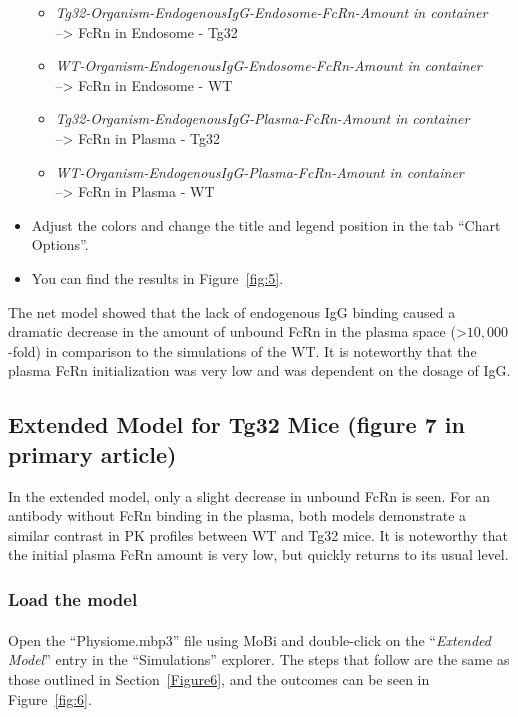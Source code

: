 \documentclass[fleqn,10pt]{physiome}
\begin{document}
\begin{itemize}
\begin{itemize}
        \item \textit{Tg32-Organism-EndogenousIgG-Endosome-FcRn-Amount in container} 
        \\--> FcRn in Endosome - Tg32
        \item \textit{WT-Organism-EndogenousIgG-Endosome-FcRn-Amount in container} 
        \\--> FcRn in Endosome - WT
        \item \textit{Tg32-Organism-EndogenousIgG-Plasma-FcRn-Amount in container} 
        \\--> FcRn in Plasma - Tg32
        \item \textit{WT-Organism-EndogenousIgG-Plasma-FcRn-Amount in container} 
        \\--> FcRn in Plasma - WT
    \end{itemize}
    \item Adjust the colors and change the title and legend position in the tab ``Chart Options''.
    \item You can find the results in Figure~\ref{fig:5}.
\end{itemize}

The net model showed that the lack of endogenous IgG binding caused a dramatic decrease in the amount of unbound FcRn in the plasma space (>$10,000$-fold) in comparison to the simulations of the WT. It is noteworthy that the plasma FcRn initialization was very low and was dependent on the dosage of IgG.



\subsection{Extended Model for Tg32 Mice (figure 7 in primary article)}\label{Figure7}

In the extended model, only a slight decrease in unbound FcRn is seen. For an antibody without FcRn binding in the plasma, both models demonstrate a similar contrast in PK profiles between WT and Tg32 mice. It is noteworthy that the initial plasma FcRn amount is very low, but quickly returns to its usual level.

\subsubsection{Load the model}
Open the ``Physiome.mbp3'' file using MoBi\textsuperscript{\textregistered} and double-click on the ``\textit{Extended Model}'' entry in the ``Simulations'' explorer. The steps that follow are the same as those outlined in Section~\ref{Figure6}, and the outcomes can be seen in Figure~\ref{fig:6}.
\end{document}
